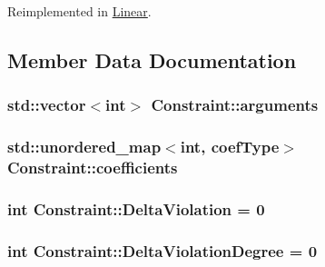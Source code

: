 Reimplemented in \hyperlink{class_linear_a21831311c105f308c01fa371a2f8fec7}{Linear}.



\subsection{Member Data Documentation}
\hypertarget{class_constraint_a070f51ff894d874d90f550bbec989fe7}{
\subsubsection[{arguments}]{\setlength{\rightskip}{0pt plus 5cm}std\-::vector$<$int$>$ Constraint\-::arguments\hspace{0.3cm}{\ttfamily [protected]}}}\label{class_constraint_a070f51ff894d874d90f550bbec989fe7}
\hypertarget{class_constraint_a976da5d8a1e74efb119f47094b721df9}{
\subsubsection[{coefficients}]{\setlength{\rightskip}{0pt plus 5cm}std\-::unordered\-\_\-map$<$int, {\bf coef\-Type}$>$ Constraint\-::coefficients\hspace{0.3cm}{\ttfamily [protected]}}}\label{class_constraint_a976da5d8a1e74efb119f47094b721df9}
\hypertarget{class_constraint_a8bddcdcac31ae446e91fd57a78841c75}{
\subsubsection[{Delta\-Violation}]{\setlength{\rightskip}{0pt plus 5cm}int Constraint\-::\-Delta\-Violation = 0\hspace{0.3cm}{\ttfamily [protected]}}}\label{class_constraint_a8bddcdcac31ae446e91fd57a78841c75}
\hypertarget{class_constraint_a62ef0cdd114d9f44dbf4d07f9aa254f5}{
\subsubsection[{Delta\-Violation\-Degree}]{\setlength{\rightskip}{0pt plus 5cm}int Constraint\-::\-Delta\-Violation\-Degree = 0\hspace{0.3cm}{\ttfamily [protected]}}}\label{class_constraint_a62ef0cdd114d9f44dbf4d07f9aa254f5}
